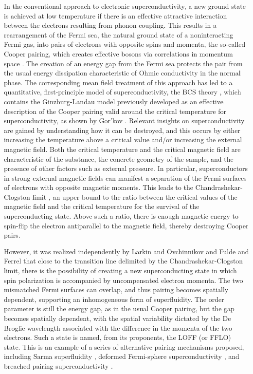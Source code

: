 \documentclass[pra,letterpaper,twocolumn,showpacs,superscriptaddress]{revtex4}
\begin{document}
In the conventional approach to electronic superconductivity, a new ground state is achieved at low temperature if there is an 
effective attractive interaction between the electrons resulting from phonon coupling. This results in a rearrangement of the Fermi sea, the natural 
ground state of a noninteracting Fermi gas, into pairs of electrons with opposite spins and  momenta, the so-called Cooper pairing, which creates 
effective bosons via correlations in momentum space \cite{Cooper1956}. The creation of an energy gap from the Fermi sea protects the pair 
from the usual energy dissipation characteristic of Ohmic conductivity in the normal phase. The corresponding mean field treatment of this approach 
has led to a quantitative, first-principle model of superconductivity, the BCS theory \cite{Bardeen1957}, which contains the Ginzburg-Landau 
model previously developed \cite{Ginzburg1950} as an effective description of the Cooper pairing valid around the critical temperature for 
superconductivity, as shown by Gor'kov \cite{Gorkov1959}. Relevant insights on superconductivity are gained by understanding how it can be 
destroyed, and this occurs by either increasing the temperature above a critical value and/or increasing the external magnetic field. 
Both the critical temperature and the critical magnetic field are characteristic of the substance, the concrete geometry of the sample, and the presence 
of other factors such as external pressure.  In particular, superconductors in strong external magnetic fields 
can manifest a separation of the Fermi surfaces of electrons with opposite magnetic moments. This leads to the Chandrashekar-Clogston limit 
\cite{Chandrashekar1962,Clogston1962}, an upper bound to the ratio between the critical values of the magnetic field and the critical temperature 
for the survival of the superconducting state. Above such a ratio, there is enough magnetic energy to spin-flip the electron antiparallel to 
the magnetic field, thereby destroying Cooper pairs. 

However, it was realized independently by Larkin and Ovchinnikov \cite{Larkin1964} and Fulde 
and Ferrel \cite{Fulde1964} that close to the transition line delimited by the Chandrashekar-Clogston limit, there is the possibility of creating a new 
superconducting state in which spin polarization is accompanied by uncompensated electron momenta. The two mismatched Fermi surfaces can overlap, and 
thus pairing becomes spatially dependent, supporting an inhomogeneous form of superfluidity. The order parameter is still the energy gap, as in the usual 
Cooper pairing, but the gap becomes spatially dependent, with the spatial variability dictated by the De Broglie wavelength associated 
with the difference in the momenta of the two electrons. Such a state is named, from its proponents, the LOFF (or FFLO) state. 
This is an example of a series of alternative pairing mechanisms proposed, including Sarma superfluidity \cite{Sarma1963,Wu2003,Pao2006}, deformed 
Fermi-sphere superconductivity \cite{Muther2002,Sedrakian2005,Sedrakian2006}, and breached pairing superconductivity \cite{Liu2003}. 
\end{document}
